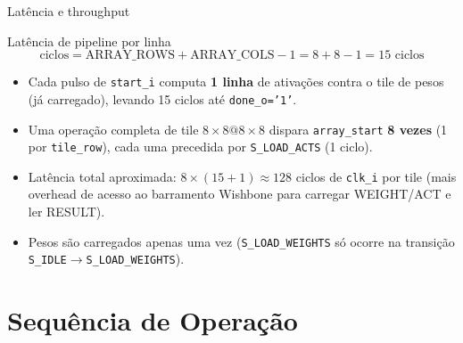 \documentclass[aspectratio=169,10pt]{beamer}
\begin{document}
\begin{frame}{Latência e throughput}
  \begin{block}{Latência de pipeline por linha}
    \[
      \text{ciclos} = \text{ARRAY\_ROWS} + \text{ARRAY\_COLS} - 1 = 8 + 8 - 1 = 15 \text{ ciclos}
    \]
  \end{block}
  \begin{itemize}
    \item Cada pulso de \texttt{start\_i} computa \textbf{1 linha} de ativações
      contra o tile de pesos (já carregado), levando 15 ciclos até
      \texttt{done\_o='1'}.
    \item Uma operação completa de tile $8\times8 @ 8\times8$ dispara
      \texttt{array\_start} \textbf{8 vezes} (1 por \texttt{tile\_row}),
      cada uma precedida por \texttt{S\_LOAD\_ACTS} (1 ciclo).
    \item Latência total aproximada: $8 \times (15 + 1) \approx 128$ ciclos de
      \texttt{clk\_i} por tile (mais overhead de acesso ao barramento
      Wishbone para carregar WEIGHT/ACT e ler RESULT).
    \item Pesos são carregados apenas uma vez (\texttt{S\_LOAD\_WEIGHTS}
      só ocorre na transição \texttt{S\_IDLE}$\to$\texttt{S\_LOAD\_WEIGHTS}).
  \end{itemize}
\end{frame}

\section{Sequência de Operação}
\end{document}
